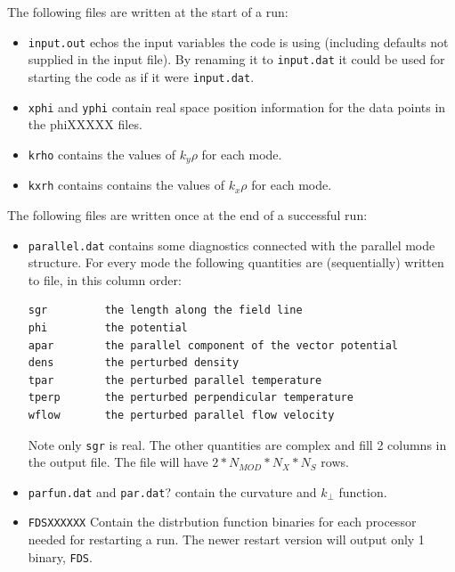 \documentclass{report}
\begin{document}
\vspace{10pt}
\noindent
The following files are written at the start of a run:
\begin{itemize}
\item \texttt{input.out} echos the input variables the code is using (including defaults not supplied in the input file). By renaming it to \texttt{input.dat} it could be used for starting the code as if it were \texttt{input.dat}.

 \item \texttt{xphi} and \texttt{yphi} contain real space position information for the data points in the phiXXXXX files.

\item \texttt{krho} contains the values of $k_y\rho$ for each mode. %

\item \texttt{kxrh} contains contains the values of $k_x\rho$ for each mode. %
\end{itemize}

\vspace{10pt}
\noindent
The following files are written once at the end of a successful run:

\begin{itemize}

\item \texttt{parallel.dat} contains some diagnostics connected with the parallel mode structure. For every mode the following quantities are (sequentially) written to file, in this column order:
\begin{verbatim}
sgr         the length along the field line 
phi         the potential 
apar        the parallel component of the vector potential 
dens        the perturbed density 
tpar        the perturbed parallel temperature 
tperp       the perturbed perpendicular temperature 
wflow       the perturbed parallel flow velocity
\end{verbatim}
Note only \texttt{sgr} is real. The other quantities are complex and fill 2 columns in the output file. The file will have $2*N_{MOD}*N_X*N_S$ rows. 

\item \texttt{parfun.dat} and \texttt{par.dat}? contain the curvature and $k_\perp$ function.

\item \texttt{FDSXXXXXX} Contain the distrbution function binaries for each processor needed for restarting a run. The newer restart version will output only 1 binary, \texttt{FDS}.
\end{itemize}
\end{document}
